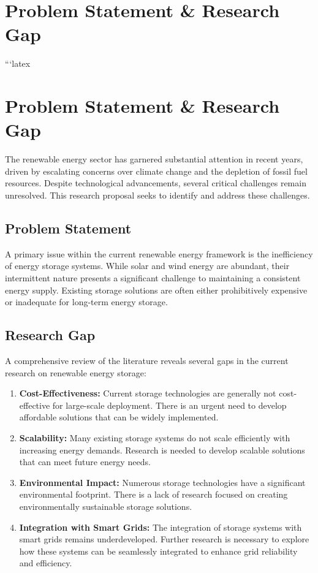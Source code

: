 \documentclass[12pt]{article}
\begin{document}
\section*{Problem Statement \& Research Gap}
```latex
\section{Problem Statement \& Research Gap}

The renewable energy sector has garnered substantial attention in recent years, driven by escalating concerns over climate change and the depletion of fossil fuel resources. Despite technological advancements, several critical challenges remain unresolved. This research proposal seeks to identify and address these challenges.

\subsection{Problem Statement}

A primary issue within the current renewable energy framework is the inefficiency of energy storage systems. While solar and wind energy are abundant, their intermittent nature presents a significant challenge to maintaining a consistent energy supply. Existing storage solutions are often either prohibitively expensive or inadequate for long-term energy storage.

\subsection{Research Gap}

A comprehensive review of the literature reveals several gaps in the current research on renewable energy storage:

\begin{enumerate}
    \item \textbf{Cost-Effectiveness:} Current storage technologies are generally not cost-effective for large-scale deployment. There is an urgent need to develop affordable solutions that can be widely implemented.
    \item \textbf{Scalability:} Many existing storage systems do not scale efficiently with increasing energy demands. Research is needed to develop scalable solutions that can meet future energy needs.
    \item \textbf{Environmental Impact:} Numerous storage technologies have a significant environmental footprint. There is a lack of research focused on creating environmentally sustainable storage solutions.
    \item \textbf{Integration with Smart Grids:} The integration of storage systems with smart grids remains underdeveloped. Further research is necessary to explore how these systems can be seamlessly integrated to enhance grid reliability and efficiency.
\end{enumerate}
\end{document}
